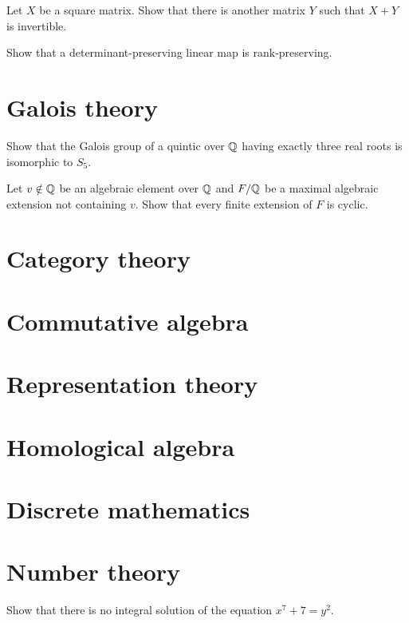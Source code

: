 \documentclass[12pt]{article}
\begin{document}
	\begin{prb}
	Let $X$ be a square matrix. Show that there is another matrix $Y$ such that $X+Y$ is invertible.
	\end{prb}

	\begin{prb}
	Show that a determinant-preserving linear map is rank-preserving.
	\end{prb}




\section{Galois theory}

	\begin{prb}
	Show that the Galois group of a quintic over $\mathbb{Q}$ having exactly three real roots is isomorphic to $S_5$.
	\end{prb}

	\begin{prb}
	Let $v\notin\mathbb{Q}$ be an algebraic element over $\mathbb{Q}$ and $F/\mathbb{Q}$ be a maximal algebraic extension not containing $v$.
	Show that every finite extension of $F$ is cyclic.
	\end{prb}


\section{Category theory}
\section{Commutative algebra}
\section{Representation theory}
\section{Homological algebra}
\section{Discrete mathematics}
\section{Number theory}
	\begin{prb}
	Show that there is no integral solution of the equation $x^7+7=y^2$.
	\end{prb}
\end{document}
